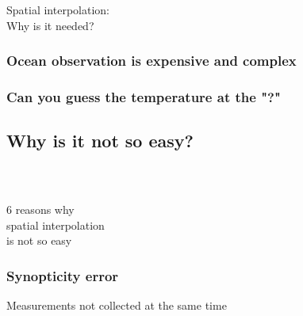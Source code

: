 \begin{frame}
\frametitle{~}

\fontsize{35}{20}\selectfont Spatial interpolation:\\Why is it needed?
\end{frame}

\begin{frame}[c]
\frametitle{Ocean observation is expensive and complex}



\end{frame}
\begin{frame}[b]
\frametitle{Can you guess the temperature at the "?"}




\end{frame}

\subsection{Why is it not so easy?}

\begin{frame}
\frametitle{~}
6 reasons why\\ {\fontsize{35}{20}\selectfont spatial interpolation}\\ is not so easy
\end{frame}

\begin{frame}[b]
\frametitle{ Synopticity error}

Measurements not collected at the same time

\vspace{.5cm}


\end{frame}

